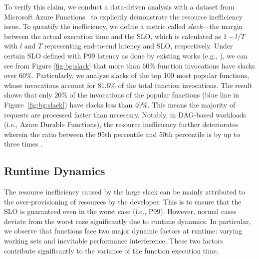 To verify this claim, we conduct a data-driven analysis with a dataset from Microsoft Azure Functions~\cite{azure-dataset} to explicitly demonstrate the resource inefficiency issue. %
To quantify the inefficiency, we define a metric called \emph{slack}---the margin between the actual execution time and the SLO, which is calculated as $1-l/T$ with $l$ and $T$ representing end-to-end latency and SLO, respectively.
Under certain SLO defined with P99 latency as done by existing works (e.g., \cite{osdi22-orion,mac22-wisefuse}),  we can see from Figure \ref{fig:bg:slack} that more than 60\% function invocations have slacks over 60\%.
Particularly, we analyze slacks of the top 100 most popular functions, whose invocations account for 81.6\% of the total function invocations. %
The result shows that only 20\% of the invocations of the popular functions (blue line in Figure~\ref{fig:bg:slack}) have slacks less than 40\%.
This means the majority of requests are processed faster than necessary.
Notably, in DAG-based workloads (i.e., Azure Durable Functions), the resource inefficiency further deteriorates wherein the ratio between the 95th percentile and 50th percentile is by up to three times \cite{mac22-wisefuse}.


\subsection{Runtime Dynamics}
\label{sec:bg:worst-case}

The resource inefficiency caused by the large slack can be mainly attributed to the over-provisioning of resources by the developer. This is to ensure that the SLO is guaranteed even in the worst case (i.e., P99). However, normal cases deviate from the worst case significantly due to runtime dynamics. 
In particular, we observe that functions face two major dynamic factors at runtime: varying working sets and inevitable performance interference. These two factors contribute significantly to the variance of the function execution time. 

